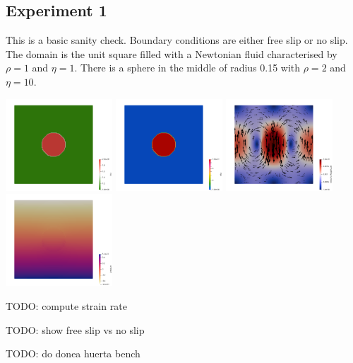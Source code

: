 \subsection*{Experiment 1}

This is a basic sanity check. Boundary conditions are either free slip or no slip.
The domain is the unit square filled with a Newtonian fluid characterised by 
$\rho=1$ and $\eta=1$. There is a sphere in the middle of radius 0.15 with $\rho=2$
and $\eta=10$.

\begin{center}
\includegraphics[width=4cm]{python_codes/fieldstone_158/results/exp1/rho}
\includegraphics[width=4cm]{python_codes/fieldstone_158/results/exp1/eta}
\includegraphics[width=4cm]{python_codes/fieldstone_158/results/exp1/vel}
\includegraphics[width=4cm]{python_codes/fieldstone_158/results/exp1/press}
\end{center} 


TODO: compute strain rate

TODO: show free slip vs no slip

TODO: do donea huerta bench




